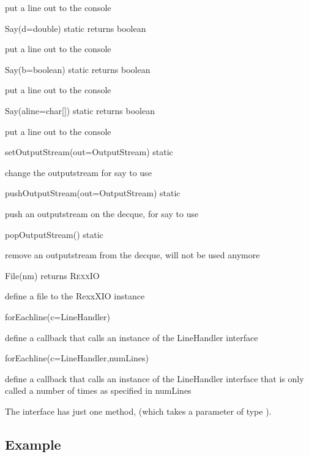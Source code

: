 \begin{description}
put a line out to the console
  \item{Say(d=double)  static returns boolean}

put a line out to the console
  \item{Say(b=boolean) static returns boolean}

put a line out to the console
  \item{Say(aline=char[]) static returns boolean}

put a line out to the console
  \item{setOutputStream(out=OutputStream) static}

change the outputstream for say to use
 
\item{pushOutputStream(out=OutputStream) static}

push an outputstream on the decque, for say to use
  \item{popOutputStream() static}

remove an outputstream from the decque, will not be used anymore
  \item{File(nm) returns R\textsc{exx}IO}

define a file to the RexxXIO instance
  \item{forEachline(c=LineHandler)}

define a callback that calls an instance of the LineHandler interface
  \item{forEachline(c=LineHandler,numLines)}

define a callback that calls an instance of the LineHandler interface that is only called a number of times as specified in numLines
\end{description}
The  interface has just one method,
 (which takes a parameter of type ).

\subsection{Example}


